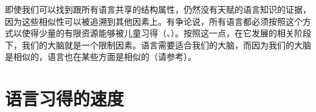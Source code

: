 即使我们可以找到跟所有语言共享的结构属性，仍然没有天赋的语言知识的证据，因为这些相似性可以被追溯到其他因素上。有争论说，所有语言都必须按照这个方式以使得少量的有限资源能够被儿童习得（\citealp[Section~10.7.2]{Hurford2002a}、\citealp[]{Behrens2009a}）。按照这一点，在它发展的相关阶段下，我们的大脑就是一个限制因素。语言需要适合我们的大脑，而因为我们的大脑是相似的，语言也在某些方面是相似的（请参考\citealp[]{Kluender92a}）。

\section{语言习得的速度}
\label{Abschnitt-Geschwindigkeit-Spracherwerb}

